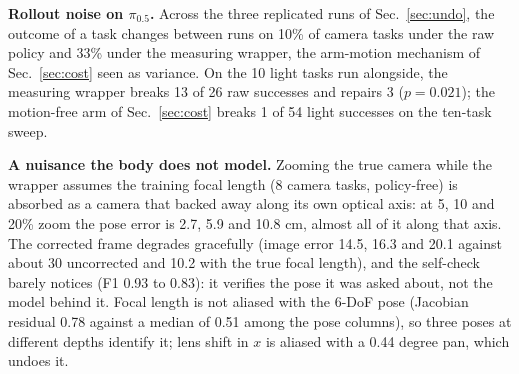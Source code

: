 \documentclass{article}
\begin{document}
\textbf{Rollout noise on $\pi_{0.5}$.} Across the three replicated runs of Sec.~\ref{sec:undo}, the outcome of a task
changes between runs on 10\% of camera tasks under the raw policy and 33\% under the measuring wrapper, the arm-motion
mechanism of Sec.~\ref{sec:cost} seen as variance. On the 10 light tasks run alongside, the measuring wrapper breaks
13 of 26 raw successes and repairs 3 ($p=0.021$); the motion-free arm of Sec.~\ref{sec:cost} breaks 1 of 54 light
successes on the ten-task sweep.

\textbf{A nuisance the body does not model.} Zooming the true camera while the wrapper assumes the training focal
length (8 camera tasks, policy-free) is absorbed as a camera that backed away along its own optical axis: at 5, 10 and
20\% zoom the pose error is 2.7, 5.9 and 10.8 cm, almost all of it along that axis. The corrected frame degrades
gracefully (image error 14.5, 16.3 and 20.1 against about 30 uncorrected and 10.2 with the true focal length), and the
self-check barely notices (F1 0.93 to 0.83): it verifies the pose it was asked about, not the model behind it. Focal
length is not aliased with the 6-DoF pose (Jacobian residual 0.78 against a median of 0.51 among the pose columns), so
three poses at different depths identify it; lens shift in $x$ is aliased with a 0.44 degree pan, which undoes it.
\end{document}
